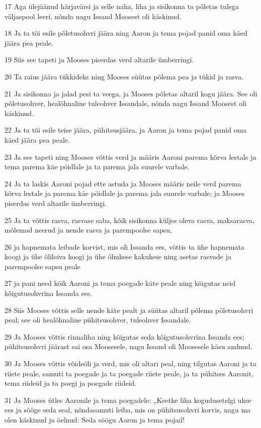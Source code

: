 \par 17 Aga ülejäänud härjavärsi ja selle naha, liha ja sisikonna ta põletas tulega väljaspool leeri, nõnda nagu Issand Moosest oli käskinud.
\par 18 Ja ta tõi esile põletusohvri jäära ning Aaron ja tema pojad panid oma käed jäära pea peale.
\par 19 Siis see tapeti ja Mooses piserdas verd altarile ümberringi.
\par 20 Ta raius jäära tükkideks ning Mooses süütas põlema pea ja tükid ja rasva.
\par 21 Ja sisikonna ja jalad pesi ta veega, ja Mooses põletas altaril kogu jäära. See oli põletusohver, healõhnaline tuleohver Issandale, nõnda nagu Issand Moosest oli käskinud.
\par 22 Ja ta tõi esile teise jäära, pühitsusjäära, ja Aaron ja tema pojad panid oma käed jäära pea peale.
\par 23 Ja see tapeti ning Mooses võttis verd ja määris Aaroni parema kõrva lestale ja tema parema käe pöidlale ja ta parema jala suurele varbale.
\par 24 Ja ta laskis Aaroni pojad ette astuda ja Mooses määris neile verd parema kõrva lestale ja parema käe pöidlale ja parema jala suurele varbale; ja Mooses piserdas verd altarile ümberringi.
\par 25 Ja ta võttis rasva, rasvase saba, kõik sisikonna küljes oleva rasva, maksarasva, mõlemad neerud ja nende rasva ja parempoolse sapsu,
\par 26 ja hapnemata leibade korvist, mis oli Issanda ees, võttis ta ühe hapnemata koogi ja ühe õlileiva koogi ja ühe õhukese kakukese ning asetas rasvade ja parempoolse sapsu peale
\par 27 ja pani need kõik Aaroni ja tema poegade käte peale ning kõigutas neid kõigutusohvrina Issanda ees.
\par 28 Siis Mooses võttis selle nende käte pealt ja süütas altaril põlema põletusohvri peal; see oli healõhnaline pühitsusohver, tuleohver Issandale.
\par 29 Ja Mooses võttis rinnaliha ning kõigutas seda kõigutusohvrina Issanda ees; pühitsusohvri jäärast sai osa Moosesele, nagu Issand oli Moosesele käsu andnud.
\par 30 Ja Mooses võttis võideõli ja verd, mis oli altari peal, ning tilgutas Aaroni ja ta riiete peale, samuti ta poegade ja ta poegade riiete peale, ja ta pühitses Aaronit, tema riideid ja ta poegi ja poegade riideid.
\par 31 Ja Mooses ütles Aaronile ja tema poegadele: „Keetke liha kogudusetelgi ukse ees ja sööge seda seal, nõndasamuti leiba, mis on pühitsusohvri korvis, nagu ma olen käskinud ja öelnud: Seda söögu Aaron ja tema pojad!
